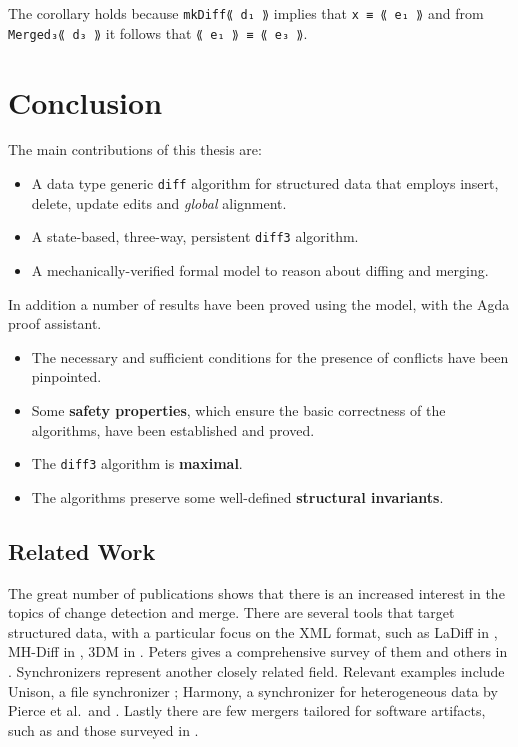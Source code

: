 \documentclass[../Thesis.tex]{subfiles}
\begin{document}
	The corollary holds because \texttt{mkDiff⟪ d₁ ⟫} implies that
	\texttt{x ≡ ⟪ e₁ ⟫} and from \texttt{Merged₃⟪ d₃ ⟫} it follows
	that \texttt{⟪ e₁ ⟫ ≡ ⟪ e₃ ⟫}.
	
\section{Conclusion}
The main contributions of this thesis are:
\begin{itemize}
	\item A data type generic \texttt{diff} algorithm for structured
			data that employs insert, delete, update edits and \emph{global} 
			alignment.
	\item A state-based, three-way, persistent \texttt{diff3} algorithm.
	\item A mechanically-verified formal model to reason about diffing 
				and merging.
\end{itemize}

In addition a number of results have been proved using the model, with
the Agda proof assistant.
\begin{itemize}
	\item The necessary and sufficient conditions for the presence of conflicts 
	have been pinpointed.
	\item Some \textbf{safety properties}, which ensure the basic correctness 
	of the algorithms, have been established and proved.
	\item The \texttt{diff3} algorithm is \textbf{maximal}.
	\item The algorithms preserve some well-defined \textbf{structural invariants}.
\end{itemize}

	\subsection{Related Work}
	The great number of publications shows that there is an increased 
	interest in the topics of change detection and merge.
	There are several tools that target structured data, with a particular
	focus on the XML format, such as 
	LaDiff in \cite{Chawathe96}, MH-Diff in \cite{Chawathe97}, 3DM in 
	\cite{Lind01, Lind04, Lind05}.
	Peters gives a comprehensive survey of them and others in 
	\cite{PetersSurvey}.
	Synchronizers represent another closely related field.
	Relevant examples include Unison, a file synchronizer \cite{Pierce98, 
	UnisonSpec}; Harmony, a synchronizer for 
	heterogeneous data	\cite{HarmonyOverview,Pierce07} by Pierce et al.\ and
	\cite{Ramsey01}.
	Lastly there are few mergers tailored for software artifacts, such
	as \cite{Westfechtel91, Apel11} and those surveyed in \cite{Mens02}.
\end{document}

